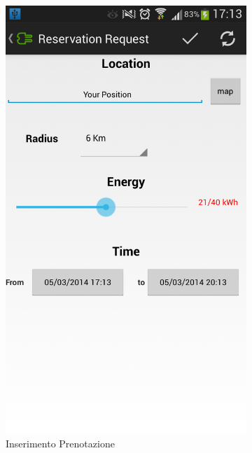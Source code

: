 \begin{figure}
	\centering
	\begin{subfigure}{0.45\textwidth}
		\includegraphics[width=\textwidth]{assets/mobile-app-charge-request.png}
		\caption{Inserimento Prenotazione}
		\label{fig:charge-request}
	\end{subfigure}
	\begin{subfigure}{0.45\textwidth}

\end{subfigure}
\end{figure}

